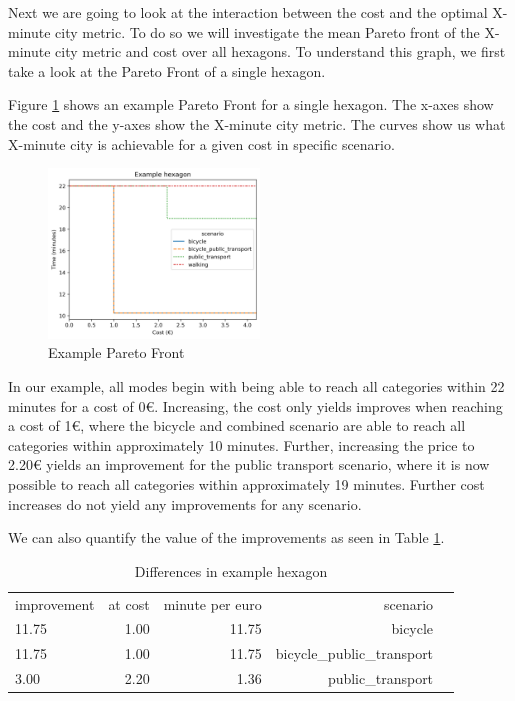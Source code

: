 Next we are going to look at the interaction between the cost and the optimal X-minute city metric.
To do so we will investigate the mean Pareto front of the X-minute city metric and cost over all hexagons.
To understand this graph, we first take a look at the Pareto Front of a single hexagon.

Figure \ref{fig:example_pareto_front} shows an example Pareto Front for a single hexagon.
The x-axes show the cost and the y-axes show the X-minute city metric.
The curves show us what X-minute city is achievable for a given cost in specific scenario.

\begin{figure}
  \begin{center}
     \includegraphics[width=0.5\textwidth]{Figures/results/metric_cost/example_profile}
  \end{center}
  \caption{Example Pareto Front}
  \label{fig:example_pareto_front}
\end{figure}

In our example, all modes begin with being able to reach all categories within 22 minutes for a cost of 0€.
Increasing, the cost only yields improves when reaching a cost of 1€, where the bicycle and combined scenario are able to reach all categories within approximately 10 minutes.
Further, increasing the price to 2.20€ yields an improvement for the public transport scenario, where it is now possible to reach all categories within approximately 19 minutes.
Further cost increases do not yield any improvements for any scenario.

We can also quantify the value of the improvements as seen in Table \ref{tab:differences_in_example_hexagon}.

\begin{table}
  \caption{Differences in example hexagon}
  \label{tab:differences_in_example_hexagon}
  \begin{center}
    \begin{tabular}{lrrrl}
    improvement & at cost & minute per euro & scenario \\
    11.75 & 1.00 & 11.75 & bicycle \\
    11.75 & 1.00 & 11.75 & bicycle_public_transport \\
    3.00 & 2.20 & 1.36 & public_transport \\
    \end{tabular}
  \end{center}
\end{table}

